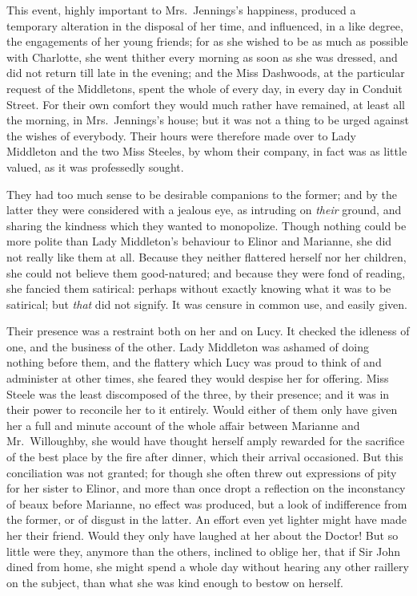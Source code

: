 This event, highly important to Mrs.\ Jennings's happiness,
produced a temporary alteration in the disposal of her time,
and influenced, in a like degree, the engagements
of her young friends; for as she wished to be as much
as possible with Charlotte, she went thither every morning
as soon as she was dressed, and did not return till late
in the evening; and the Miss Dashwoods, at the particular
request of the Middletons, spent the whole of every day,
in every day in Conduit Street.  For their own comfort
they would much rather have remained, at least all
the morning, in Mrs.\ Jennings's house; but it was not
a thing to be urged against the wishes of everybody.
Their hours were therefore made over to Lady Middleton
and the two Miss Steeles, by whom their company, in fact
was as little valued, as it was professedly sought.

They had too much sense to be desirable companions
to the former; and by the latter they were considered with
a jealous eye, as intruding on \emph{their} ground, and sharing
the kindness which they wanted to monopolize.  Though nothing
could be more polite than Lady Middleton's behaviour to
Elinor and Marianne, she did not really like them at all.
Because they neither flattered herself nor her children,
she could not believe them good-natured; and because they
were fond of reading, she fancied them satirical: perhaps
without exactly knowing what it was to be satirical;
but \emph{that} did not signify.  It was censure in common use,
and easily given.

Their presence was a restraint both on her and on Lucy.
It checked the idleness of one, and the business of the other.
Lady Middleton was ashamed of doing nothing before them,
and the flattery which Lucy was proud to think of
and administer at other times, she feared they would despise
her for offering.  Miss Steele was the least discomposed
of the three, by their presence; and it was in their power
to reconcile her to it entirely.  Would either of them
only have given her a full and minute account of the whole
affair between Marianne and Mr.\ Willoughby, she would
have thought herself amply rewarded for the sacrifice
of the best place by the fire after dinner, which their
arrival occasioned.  But this conciliation was not granted;
for though she often threw out expressions of pity for her
sister to Elinor, and more than once dropt a reflection
on the inconstancy of beaux before Marianne, no effect
was produced, but a look of indifference from the former,
or of disgust in the latter.  An effort even yet lighter
might have made her their friend.  Would they only have
laughed at her about the Doctor!  But so little were they,
anymore than the others, inclined to oblige her,
that if Sir John dined from home, she might spend a whole
day without hearing any other raillery on the subject,
than what she was kind enough to bestow on herself.

